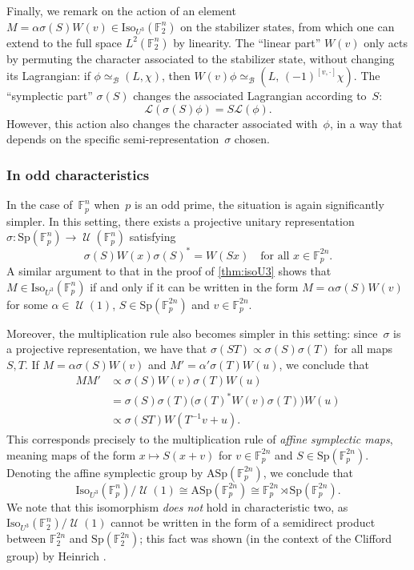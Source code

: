 \documentclass[11pt]{amsart}
\newcommand{\F}{\mathbb{F}} %
\newcommand{\Lcal}{\mathcal{L}}
\newcommand{\Iso}{\mathrm{Iso}}
\newcommand{\Sp}{\mathrm{Sp}}
\newcommand{\ASp}{\mathrm{ASp}}
\DeclareMathOperator{\U}{\mathcal{U}}
\newcommand{\B}{\mathcal B}
\theoremstyle{plain}
\theoremstyle{definition}
\theoremstyle{remark}
\begin{document}
Finally, we remark on the action of an element $M = \alpha \sigma(S)W(v) \in \Iso_{U^3}(\F_2^n)$ on the stabilizer states, from which one can extend to the full space $L^2(\F_2^n)$ by linearity.
The ``linear part'' $W(v)$ only acts by permuting the character associated to the stabilizer state, without changing its Lagrangian:
if $\phi \simeq_\B (L, \chi)$, then $W(v)\phi \simeq_\B (L,\, (-1)^{[v,\cdot]} \chi)$.
The ``symplectic part'' $\sigma(S)$ changes the associated Lagrangian according to~$S$:
$$\Lcal(\sigma(S)\phi) = S\Lcal(\phi).$$
However, this action also changes the character associated with~$\phi$, in a way that depends on the specific semi-representation~$\sigma$ chosen.


\subsubsection{In odd characteristics}

In the case of~$\F_p^n$ when~$p$ is an odd prime, the situation is again significantly simpler.
In this setting, there exists a projective unitary representation $\sigma: \Sp(\F_p^n) \to \U(\F_p^n)$ satisfying
$$\sigma(S) W(x) \sigma(S)^* = W(Sx) \quad \text{for all $x\in \F_p^{2n}$.}$$
A similar argument to that in the proof of \cref{thm:isoU3} shows that $M\in \Iso_{U^3}(\F_p^n)$ if and only if it can be written in the form $M = \alpha \sigma(S)W(v)$ for some $\alpha\in \U(1)$, $S\in \Sp(\F_p^{2n})$ and $v\in \F_p^{2n}$.

Moreover, the multiplication rule also becomes simpler in this setting:
since~$\sigma$ is a projective representation, we have that
$\sigma(ST) \propto \sigma(S)\sigma(T)$ for all maps $S,T$.
If $M = \alpha \sigma(S)W(v)$ and $M' = \alpha' \sigma(T)W(u)$, we conclude that
\begin{align*}
    MM' &\propto \sigma(S)W(v) \sigma(T)W(u) \\
    &= \sigma(S)\sigma(T) \big(\sigma(T)^* W(v)\sigma(T)\big) W(u) \\
    &\propto \sigma(ST) W(T^{-1}v+u).
\end{align*}
This corresponds precisely to the multiplication rule of \emph{affine symplectic maps}, meaning maps of the form $x \mapsto S(x+v)$ for $v\in \F_p^{2n}$ and $S\in \Sp(\F_p^{2n})$.
Denoting the affine symplectic group by $\ASp(\F_p^{2n})$, we conclude that
$$\Iso_{U^3}(\F_p^n)/\U(1) \cong \ASp(\F_p^{2n}) \cong \F_p^{2n} \rtimes \Sp(\F_p^{2n}).$$
We note that this isomorphism \emph{does not} hold in characteristic two, as $\Iso_{U^3}(\F_2^n)/\U(1)$ cannot be written in the form of a semidirect product between $\F_2^{2n}$ and $\Sp(\F_2^{2n})$;
this fact was shown (in the context of the Clifford group) by Heinrich \cite[Chapter~4]{heinrich2021}.
\end{document}
